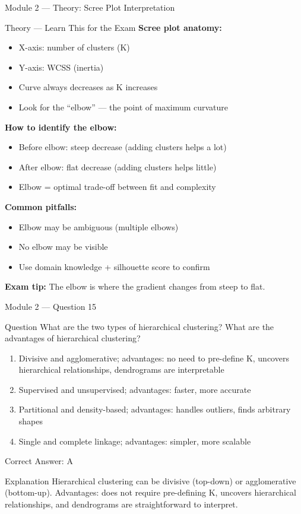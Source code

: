 \documentclass[aspectratio=169,10pt]{beamer}
\newcommand{\question}[1]{%
	\begin{block}{Question}
		#1
	\end{block}
}
\newcommand{\options}[4]{%
	\begin{enumerate}[label=\Alph*.,leftmargin=*]
		\item #1
		\item #2
		\item #3
		\item #4
	\end{enumerate}
}
\newcommand{\answerbox}[1]{%
	\begin{exampleblock}{Correct Answer: #1}
	\end{exampleblock}
}
\newcommand{\explain}[1]{%
	\begin{block}{Explanation}
		\small #1
	\end{block}
}
\newcommand{\theory}[1]{%
	\begin{block}{Theory --- Learn This for the Exam}
		\small #1
	\end{block}
}
\begin{document}
	\begin{frame}{Module 2 --- Theory: Scree Plot Interpretation}
		\theory{
			\textbf{Scree plot anatomy:}
			\begin{itemize}
				\item X-axis: number of clusters (K)
				\item Y-axis: WCSS (inertia)
				\item Curve always decreases as K increases
				\item Look for the ``elbow'' --- the point of maximum curvature
			\end{itemize}
			\textbf{How to identify the elbow:}
			\begin{itemize}
				\item Before elbow: steep decrease (adding clusters helps a lot)
				\item After elbow: flat decrease (adding clusters helps little)
				\item Elbow = optimal trade-off between fit and complexity
			\end{itemize}
			\textbf{Common pitfalls:}
			\begin{itemize}
				\item Elbow may be ambiguous (multiple elbows)
				\item No elbow may be visible
				\item Use domain knowledge + silhouette score to confirm
			\end{itemize}
			\textbf{Exam tip:} The elbow is where the gradient changes from steep to flat.
		}
	\end{frame}
	
	\begin{frame}{Module 2 --- Question 15}
		\question{What are the two types of hierarchical clustering? What are the advantages of hierarchical clustering?}
		\options{Divisive and agglomerative; advantages: no need to pre-define K, uncovers hierarchical relationships, dendrograms are interpretable}{Supervised and unsupervised; advantages: faster, more accurate}{Partitional and density-based; advantages: handles outliers, finds arbitrary shapes}{Single and complete linkage; advantages: simpler, more scalable}
		\answerbox{A}
		\explain{Hierarchical clustering can be divisive (top-down) or agglomerative (bottom-up). Advantages: does not require pre-defining K, uncovers hierarchical relationships, and dendrograms are straightforward to interpret.}
	\end{frame}
	
\end{document}
